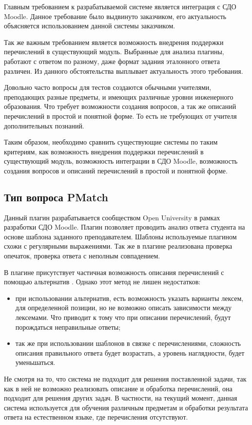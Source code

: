 \documentclass[a4paper,english,russian]{G2-105}
\begin{document}
\par Главным требованием к разрабатываемой системе является интеграция с СДО Moodle. Данное требование было выдвинуто заказчиком, его актуальность объясняется использованием данной системы заказчиком.
\par Так же важным требованием является возможность внедрения поддержки перечислений в существующий модуль. Выбранные для анализа плагины, работают с ответом по разному, даже формат задания эталонного ответа различен. Из данного обстоятельства выплывает актуальность этого требования.
\par Довольно часто вопросы для тестов создаются обычными учителями, преподающих разные предметы, и имеющих различные уровни инженерного образования. Что требует возможности создания вопросов, а так же описаний перечислений в простой и понятной форме. То есть не требующих от учителя дополнительных познаний.
\par Таким образом, необходимо сравнить существующие системы по таким критериям, как возможность внедрения поддержки перечислений в существующий модуль, возможность интеграции в СДО Moodle, возможность создания вопросов и описаний перечислений в простой и понятной форме.  

\subsection{Тип вопроса PMatch}

\par Данный плагин разрабатывается сообществом Open University в рамках разработки СДО Moodle. Плагин позволяет проводить анализ ответа студента на основе шаблона заданного преподавателем. Шаблоны используемые плагином схожи с регулярными выражениями. Так же в плагине реализована проверка опечаток, проверка ответа с неполным совпадением.
\par В плагине присутствует частичная возможность описания перечислений с помощью альтернатив \cite{1}. Однако этот метод не лишен недостатков: 
\begin{itemize}
    \item при использовании альтернатив, есть возможность указать варианты лексем, для определенной позиции, но не возможно описать зависимости между лексемами. Что приводит к тому что при описании перечислений, будут порождаться неправильные ответы;
    \item так же при использовании шаблонов в связке с перечислениями, сложность описания правильного ответа будет возрастать, а уровень наглядности, будет уменьшаться.
\end{itemize}
\par Не смотря на то, что система не подходит для решения поставленной задачи, так как в ней не возможно реализовать описание и обработка перечислений, она подходит для решения других задач. В частности, на текущий момент, данная система используется для обучения различным предметам и обработки результата ответа на естественном языке, где перечисления отсутствуют. 
\end{document}
